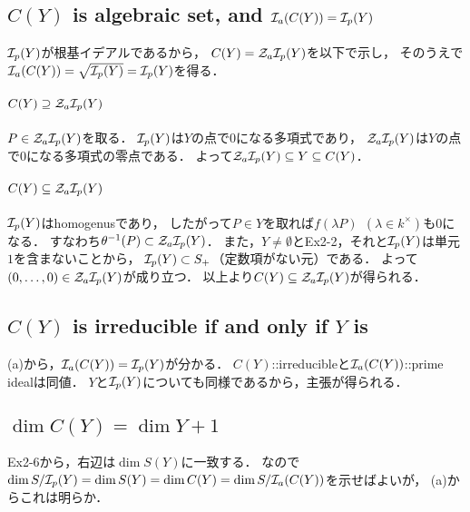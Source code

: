 \documentclass[a4paper]{jarticle}
\begin{document}
\section{} %
    \subsection{$C(Y)$ is algebraic set, and $\mathcal{I}_a(C(Y))=\mathcal{I}_p(Y)$}
    $\mathcal{I}_p(Y)$が根基イデアルであるから，
    $C(Y)=\mathcal{Z}_a \mathcal{I}_p(Y)$を以下で示し，
    そのうえで$\mathcal{I}_a(C(Y))=\sqrt{\mathcal{I}_p(Y)}=\mathcal{I}_p(Y)$を得る．

    \paragraph{$C(Y) \supseteq \mathcal{Z}_a \mathcal{I}_p(Y)$}
    $P \in \mathcal{Z}_a \mathcal{I}_p(Y)$を取る．
    $\mathcal{I}_p(Y)$は$Y$の点で0になる多項式であり，
    $\mathcal{Z}_a \mathcal{I}_p(Y)$は$Y$の点で0になる多項式の零点である．
    よって$\mathcal{Z}_a \mathcal{I}_p(Y) \subseteq Y \subseteq C(Y)$．

    \paragraph{$C(Y) \subseteq \mathcal{Z}_a \mathcal{I}_p(Y)$}
    $\mathcal{I}_p(Y)$はhomogenusであり，
    したがって$P \in Y$を取れば$f(\lambda P)~~(\lambda \in k^{\times})$も0になる．
    すなわち$\theta^{-1}(P) \subset \mathcal{Z}_a \mathcal{I}_p(Y)$．
    また，$Y \neq \emptyset$とEx2-2，それと$\mathcal{I}_p(Y)$は単元$1$を含まないことから，
    $\mathcal{I}_p(Y) \subset S_{+}$（定数項がない元）である．
    よって$(0,\dots,0) \in \mathcal{Z}_a \mathcal{I}_p(Y)$が成り立つ．
    以上より$C(Y) \subseteq \mathcal{Z}_a \mathcal{I}_p(Y)$が得られる．


    \subsection{$C(Y)$ is irreducible if and only if $Y$ is}
    (a)から，$\mathcal{I}_a(C(Y))=\mathcal{I}_p(Y)$が分かる．
    $C(Y)$::irreducibleと$\mathcal{I}_a(C(Y))$::prime idealは同値．
    $Y$と$\mathcal{I}_p(Y)$についても同様であるから，主張が得られる．

    \subsection{$\dim C(Y) = \dim Y + 1$}
    Ex2-6から，右辺は$\dim S(Y)$に一致する．
    なので$\dim S/\mathcal{I}_p(Y)=\dim S(Y)=\dim C(Y)=\dim S/\mathcal{I}_a(C(Y))$を示せばよいが，
    (a)からこれは明らか．

\section{} %
\end{document}
